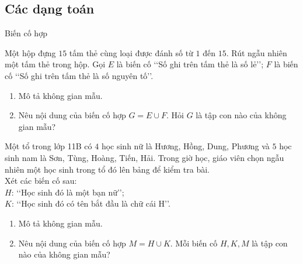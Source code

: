 \subsection{Các dạng toán}
\begin{dang}{Biến cố hợp}
\end{dang}
\begin{vd}%
	Một hộp đựng $15$ tấm thẻ cùng loại được đánh số từ $1$ đến $15$. Rút ngẫu nhiên một tấm thẻ trong hộp. Gọi $E$ là biến cố \lq\lq Số ghi trên tấm thẻ là số lẻ\rq\rq; $F$ là biến cố \lq\lq Số ghi trên tấm thẻ là số nguyên tố\rq\rq.
	\begin{enumerate}
		\item Mô tả không gian mẫu.
		\item Nêu nội dung của biến cố hợp $G=E \cup F$. Hỏi $G$ là tập con nào của không gian mẫu?
	\end{enumerate}
\end{vd}
\begin{vd}%
	Một tổ trong lớp 11B có $4$ học sinh nữ là Hương, Hồng, Dung, Phương và $5$ học sinh nam là Sơn, Tùng, Hoàng, Tiến, Hải. Trong giờ học, giáo viên chọn ngẫu nhiên một học sinh trong tổ đó lên bảng để kiểm tra bài.\\
	Xét các biến cố sau:\\
	$H$: \lq\lq Học sinh đó là một bạn nữ\rq\rq;\\
	$K$: \lq\lq Học sinh đó có tên bắt đầu là chữ cái $\mathrm{H}$\rq\rq.
	\begin{enumerate}
		\item Mô tả không gian mẫu.
		\item Nêu nội dung của biến cố hợp $M=H \cup K$. Mỗi biến cố $H, K, M$ là tập con nào của không gian mẫu?
	\end{enumerate}
\end{vd}
